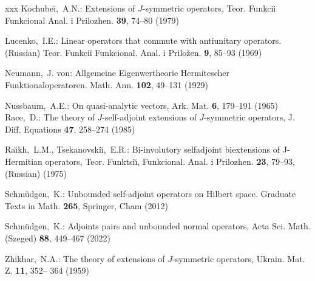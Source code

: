 \documentclass[12pt]{amsart}
\theoremstyle{definition}
\begin{document}
\begin{thebibliography}{xxx}
Kochube\u{\i},~A.N.: Extensions of $J$-symmetric operators, Teor. Funkcii Funkcional Anal. i Prilozhen. \textbf{39}, 74--80 (1979)

Lucenko,~I.E.: Linear operators that commute with antiunitary operators. (Russian)
Teor. Funkciĭ Funkcional. Anal. i Priložen. \textbf{9}, 85–93 (1969)


Neumann,~J. von: Allgemeine Eigenwertheorie Hermitescher Funktionaloperatoren. Math. Ann. \textbf{102}, 49–131 (1929)

Nussbaum,~A.E.: On quasi-analytic vectors,  Ark. Mat. \textbf{6}, 179--191 (1965)
 Race,~D.:  The theory of $J$-self-adjoint extensions of $J$-symmetric operators, J. Diff. Equations  \textbf{47}, 258--274 (1985)

Ra\u{\i}kh,~L.M., Tsekanovski\u{\i},~E.R.:
Bi-involutory selfadjoint biextensions of J-Hermitian operators,
Teor. Funktsi\u{\i}, Funkcional. Anal. i Prilozhen. \textbf{23}, 79–93, (Russian) (1975)

 Schm\"udgen,~K.: Unbounded self-adjoint operators on Hilbert space. Graduate Texts in Math. \textbf{265}, Springer,  Cham (2012)

 Schm\"udgen,~K.:  Adjoints pairs and unbounded normal operators,  Acta Sci. Math. (Szeged) \textbf{88}, 449–467 (2022)


Zhikhar,~N.A.: The theory of extensions of $J$-symmetric operators, Ukrain. Mat. Z. \textbf{11}, 352-- 364 (1959)


\end{thebibliography}
\end{document}
